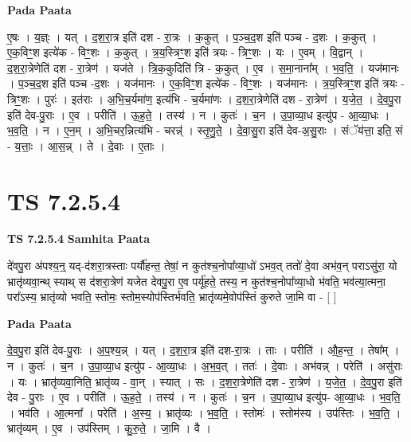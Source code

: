 \documentclass[17pt]{extarticle}
\begin{document}
\textbf{Pada Paata} \newline

ए॒षः । य॒ज्ञ्ः । यत् । द॒श॒रा॒त्र इति॑ दश - रा॒त्रः । क॒कुत् । प॒ञ्च॒द॒श इति॑ पञ्च - द॒शः । क॒कुत् । ए॒क॒विꣳ॒॒श इत्ये॑क - विꣳ॒॒शः । क॒कुत् । त्र॒य॒स्त्रिꣳ॒॒श इति॑ त्रयः - त्रिꣳ॒॒शः । यः । ए॒वम् । वि॒द्वान् । द॒श॒रा॒त्रेणेति॑ दश - रा॒त्रेण॑ । यज॑ते । त्रि॒क॒कुदिति॑ त्रि - क॒कुत् । ए॒व । स॒मा॒नाना᳚म् । भ॒व॒ति॒ । यज॑मानः । प॒ञ्च॒द॒श इति॑ पञ्च -द॒शः । यज॑मानः । ए॒क॒विꣳ॒॒श इत्ये॑क - विꣳ॒॒शः । यज॑मानः । त्र॒य॒स्त्रिꣳ॒॒श इति॑ त्रयः - त्रिꣳ॒॒शः । पुरः॑ । इत॑राः । अ॒भि॒च॒र्यमा॑ण॒ इत्य॑भि - च॒र्यमा॑णः । द॒श॒रा॒त्रेणेति॑ दश - रा॒त्रेण॑ । य॒जे॒त॒ । दे॒व॒पु॒रा इति॑ देव-पु॒राः । ए॒व । परीति॑ । ऊ॒ह॒ते॒ । तस्य॑ । न । कुतः॑ । च॒न । उ॒पा॒व्या॒ध इत्यु॑प - आ॒व्या॒धः । भ॒व॒ति॒ । न । ए॒न॒म् । अ॒भि॒चर॒न्नित्य॑भि - चरन्न्॑ । स्तृ॒णु॒ते॒ । दे॒वा॒सु॒रा इति॑ देव-अ॒सु॒राः । संॅय॑त्ता॒ इति॒ सं - य॒त्ताः॒ । आ॒स॒न्न् । ते । दे॒वाः । ए॒ताः ।  \newline





\section{ TS 7.2.5.4 }

\textbf{TS 7.2.5.4 } \newline
\textbf{Samhita Paata} \newline

दे॑वपु॒रा अ॑पश्य॒न्॒ यद्-द॑शरा॒त्रस्ताः पर्यौ॑हन्त॒ तेषां॒ न कुत॑श्च॒नोपा᳚व्या॒धो॑ ऽभव॒त् ततो॑ दे॒वा अभ॑व॒न् पराऽसु॑रा॒ यो भ्रातृ॑व्यवा॒न्थ् स्याथ् स द॑शरा॒त्रेण॑ यजेत देवपु॒रा ए॒व पर्यू॑हते॒ तस्य॒ न कुत॑श्च॒नोपा᳚व्या॒धो भ॑वति॒ भव॑त्या॒त्मना॒ परा᳚ऽस्य॒ भ्रातृ॑व्यो भवति॒ स्तोमः॒ स्तोम॒स्योप॑स्तिर्भवति॒ भ्रातृ॑व्यमे॒वोप॑स्तिं कुरुते जा॒मि वा - [  ] \newline

\textbf{Pada Paata} \newline

दे॒व॒पु॒रा इति॑ देव-पु॒राः । अ॒प॒श्य॒न्न् । यत् । द॒श॒रा॒त्र इति॑ दश-रा॒त्रः । ताः । परीति॑ । औ॒ह॒न्त॒ । तेषा᳚म् । न । कुतः॑ । च॒न । उ॒पा॒व्या॒ध इत्यु॑प - आ॒व्या॒धः । अ॒भ॒व॒त् । ततः॑ । दे॒वाः । अभ॑वन्न् । परेति॑ । असु॑राः । यः । भ्रातृ॑व्यवा॒निति॒ भ्रातृ॑व्य - वा॒न् । स्यात् । सः । द॒श॒रा॒त्रेणेति॑ दश - रा॒त्रेण॑ । य॒जे॒त॒ । दे॒व॒पु॒रा इति॑ देव - पु॒राः । ए॒व । परीति॑ । ऊ॒ह॒ते॒ । तस्य॑ । न । कुतः॑ । च॒न । उ॒पा॒व्या॒ध इत्यु॑प- आ॒व्या॒धः । भ॒व॒ति॒ । भव॑ति । आ॒त्मना᳚ । परेति॑ । अ॒स्य॒ । भ्रातृ॑व्यः । भ॒व॒ति॒ । स्तोमः॑ । स्तोम॑स्य । उप॑स्तिः । भ॒व॒ति॒ । भ्रातृ॑व्यम् । ए॒व । उप॑स्तिम् । कु॒रु॒ते॒ । जा॒मि । वै ।  \newline
\end{document}
